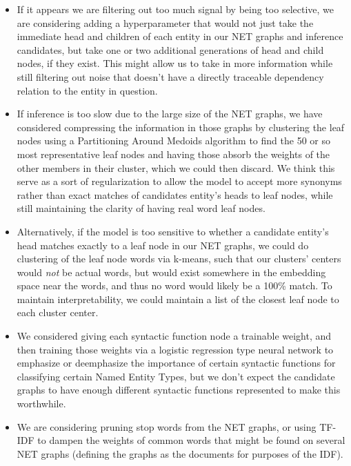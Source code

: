 \documentclass[11pt,a4paper]{article}
\begin{document}
\begin{itemize}

\item If it appears we are filtering out too much signal by being too selective, we are considering adding a hyperparameter that would not just take the immediate head and children of each entity in our NET graphs and inference candidates, but take one or two additional generations of head and child nodes, if they exist. This might allow us to take in more information while still filtering out noise that doesn't have a directly traceable dependency relation to the entity in question.

\item If inference is too slow due to the large size of the NET graphs, we have considered compressing the information in those graphs by clustering the leaf nodes using a Partitioning Around Medoids algorithm to find the 50 or so most representative leaf nodes and having those absorb the weights of the other members in their cluster, which we could then discard. We think this serve as a sort of regularization to allow the model to accept more synonyms rather than exact matches of candidates entity's heads to leaf nodes, while still maintaining the clarity of having real word leaf nodes.

\item Alternatively, if the model is too sensitive to whether a candidate entity's head matches exactly to a leaf node in our NET graphs, we could do clustering of the leaf node words via k-means, such that our clusters' centers would \textit{not} be actual words, but would exist somewhere in the embedding space near the words, and thus no word would likely be a 100\% match. To maintain interpretability, we could maintain a list of the closest leaf node to each cluster center.

\item We considered giving each syntactic function node a trainable weight, and then training those weights via a logistic regression type neural network to emphasize or deemphasize the importance of certain syntactic functions for classifying certain Named Entity Types, but we don't expect the candidate graphs to have enough different syntactic functions represented to make this worthwhile.

\item We are considering pruning stop words from the NET graphs, or using TF-IDF to dampen the weights of common words that might be found on several NET graphs (defining the graphs as the documents for purposes of the IDF).

\end{itemize}





\end{document}
